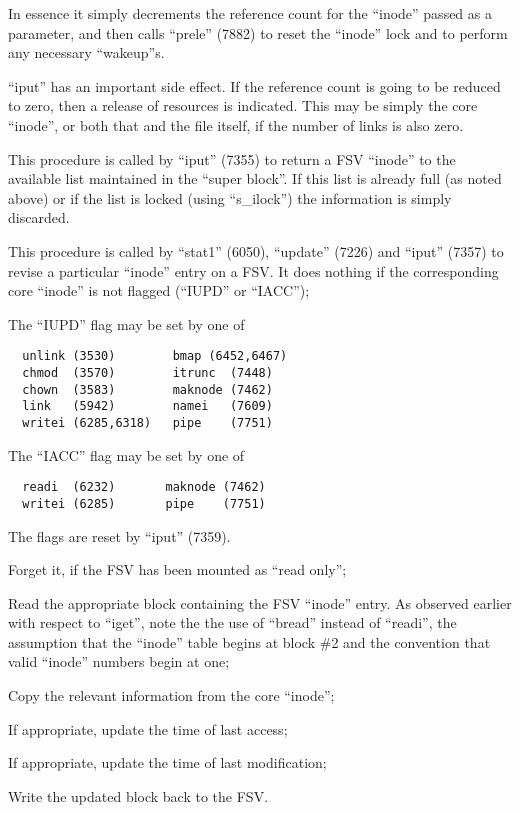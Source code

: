 In essence  it  simply  decrements  the
reference  count for the ``inode'' passed
as a parameter, and then calls  ``prele''
(7882) to reset the ``inode'' lock and to
perform any necessary ``wakeup''s.


``iput'' has an important side effect. If
the  reference  count  is  going  to be
reduced to  zero,  then  a  release  of
resources  is  indicated.  This  may be
simply the core ``inode'', or  both  that
and  the  file itself, if the number of
links is also zero.





This  procedure  is  called  by  ``iput''
(7355)  to  return a FSV ``inode'' to the
available list maintained in the ``super
block''.  If  this  list is already full
(as noted above)  or  if  the  list  is
locked  (using  ``s\_ilock'') the information is simply discarded.



This procedure  is  called  by ``stat1''
(6050),   ``update''  (7226)  and  ``iput''
(7357) to revise a  particular  ``inode''
entry  on a FSV. It does nothing if the
corresponding  core  ``inode''   is   not
flagged (``IUPD'' or ``IACC'');


The ``IUPD'' flag may be set by one of

\begin{verbatim}
  unlink (3530)        bmap (6452,6467)
  chmod  (3570)        itrunc  (7448)
  chown  (3583)        maknode (7462)
  link   (5942)        namei   (7609)
  writei (6285,6318)   pipe    (7751)
\end{verbatim}

\noindent The ``IACC'' flag may be set by one of

\begin{verbatim}
  readi  (6232)       maknode (7462)
  writei (6285)       pipe    (7751)
\end{verbatim}


The flags are reset by ``iput'' (7359).

\bd
\item[7383:] Forget it, if the  FSV  has  been
mounted as ``read only'';


\item[7386:] Read the appropriate  block  containing  the  FSV  ``inode'' entry.
      As observed earlier with  respect
      to  ``iget'',  note  the the use of
      ``bread'' instead of  ``readi'',  the
      assumption that the ``inode'' table
      begins at block \#2 and  the  convention    that   valid   ``inode''
      numbers begin at one;


\item[7389:] Copy  the  relevant   information
      from the core ``inode'';


\item[7391:] If appropriate, update  the  time
      of last access;


\item[7396:] If appropriate, update  the  time
      of last modification;


\item[7400:] Write the updated block  back  to
      the FSV.
\ed
